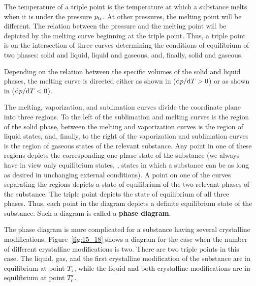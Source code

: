 The temperature of a triple point is the temperature at which a substance melts when it is under the pressure $p_{\text{tr}}$. At other pressures, the melting point will be different. The relation between the pressure and the melting point will be depicted by the melting curve beginning at the triple point. Thus, a triple point is on the intersection of three curves determining the conditions of equilibrium of two phases: solid and liquid, liquid and gaseous, and, finally, solid and gaseous.

Depending on the relation between the specific volumes of the solid and liquid phases, the melting curve is directed either as shown in  ($\mathrm{d} p/\mathrm{d} T>0$) or as shown in  ($\mathrm{d} p/\mathrm{d} T<0$).

The melting, vaporization, and sublimation curves divide the coordinate plane into three regions. To the left of the sublimation and melting curves is the region of the solid phase, between the melting and vaporization curves is the region of liquid states, and, finally, to the right of the vaporization and sublimation curves is the region of gaseous states of the relevant substance. Any point in one of these regions depicts the corresponding one-phase state of the substance (we always have in view only equilibrium states, \ie, states in which a substance can be as long as desired in unchanging external conditions). A point on one of the curves separating the regions depicts a state of equilibrium of the two relevant phases of the substance. The triple point depicts the state of equilibrium of all three phases. Thus, each point in the diagram depicts a definite equilibrium state of the substance. Such a diagram is called a \textbf{phase diagram}.

The phase diagram is more complicated for a substance having several crystalline modifications. Figure~\ref{fig:15_18} shows a diagram for the case when the number of different crystalline modifications is two. There are two triple points in this case. The liquid, gas, and the first crystalline modification of the substance are in equilibrium at point $T_{\text{r}}$, while the liquid and both crystalline modifications are in equilibrium at point $T_{\text{r}}'$.

